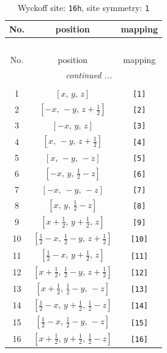 \documentclass[fleqn,8pt]{jsarticle}
\begin{document}
\begin{longtable}{ccc}
\caption{Wyckoff site: {\tt 16h}, site symmetry: {\tt 1}}
 \\
 \hline \hline
No. & position & mapping \\ \hline \endfirsthead

\multicolumn{2}{l}{\tablename\ \thetable{}} \\
 \hline \hline
No. & position & mapping \\ \hline \endhead

 \hline \hline
\multicolumn{2}{r}{\footnotesize\it continued ...} \\ \endfoot

 \hline \hline
\multicolumn{2}{r}{} \\ \endlastfoot

1 & $\left[ x,\, y,\, z \right]$ & {\tt [1]} \\ \hline
2 & $\left[ - x,\, - y,\, z + \frac{1}{2} \right]$ & {\tt [2]} \\ \hline
3 & $\left[ - x,\, y,\, z \right]$ & {\tt [3]} \\ \hline
4 & $\left[ x,\, - y,\, z + \frac{1}{2} \right]$ & {\tt [4]} \\ \hline
5 & $\left[ x,\, - y,\, - z \right]$ & {\tt [5]} \\ \hline
6 & $\left[ - x,\, y,\, \frac{1}{2} - z \right]$ & {\tt [6]} \\ \hline
7 & $\left[ - x,\, - y,\, - z \right]$ & {\tt [7]} \\ \hline
8 & $\left[ x,\, y,\, \frac{1}{2} - z \right]$ & {\tt [8]} \\ \hline
9 & $\left[ x + \frac{1}{2},\, y + \frac{1}{2},\, z \right]$ & {\tt [9]} \\ \hline
10 & $\left[ \frac{1}{2} - x,\, \frac{1}{2} - y,\, z + \frac{1}{2} \right]$ & {\tt [10]} \\ \hline
11 & $\left[ \frac{1}{2} - x,\, y + \frac{1}{2},\, z \right]$ & {\tt [11]} \\ \hline
12 & $\left[ x + \frac{1}{2},\, \frac{1}{2} - y,\, z + \frac{1}{2} \right]$ & {\tt [12]} \\ \hline
13 & $\left[ x + \frac{1}{2},\, \frac{1}{2} - y,\, - z \right]$ & {\tt [13]} \\ \hline
14 & $\left[ \frac{1}{2} - x,\, y + \frac{1}{2},\, \frac{1}{2} - z \right]$ & {\tt [14]} \\ \hline
15 & $\left[ \frac{1}{2} - x,\, \frac{1}{2} - y,\, - z \right]$ & {\tt [15]} \\ \hline
16 & $\left[ x + \frac{1}{2},\, y + \frac{1}{2},\, \frac{1}{2} - z \right]$ & {\tt [16]} \\
\end{longtable}
\end{document}
